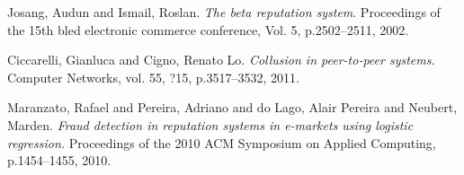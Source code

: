\documentclass[11pt]{article}
\begin{document}
\begin{thebibliography}{1}
 
Josang, Audun and Ismail, Roslan. 
\textit{The beta reputation system}.
Proceedings of the 15th bled electronic commerce conference, Vol. 5, p.2502--2511, 2002.

Ciccarelli, Gianluca and Cigno, Renato Lo.
\textit{Collusion in peer-to-peer systems}.
Computer Networks, vol. 55, ?15, p.3517--3532, 2011.

Maranzato, Rafael and Pereira, Adriano and do Lago, Alair Pereira and Neubert, Marden.
\textit{Fraud detection in reputation systems in e-markets using logistic regression.}
Proceedings of the 2010 ACM Symposium on Applied Computing, p.1454--1455, 2010.

\end{thebibliography}
\end{document}
